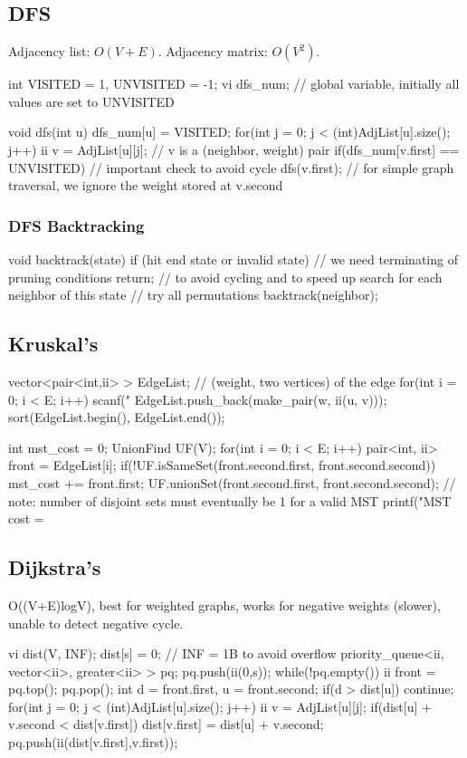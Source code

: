 \documentclass{article}
\begin{document}
\subsection{DFS}
Adjacency list: \(O(V + E)\). Adjacency matrix: \(O(V^2)\).
\begin{mylisting}{}
int VISITED = 1, UNVISITED = -1;
vi dfs_num;	// global variable, initially all values are set to UNVISITED

void dfs(int u){
	dfs_num[u] = VISITED;
	for(int j = 0; j < (int)AdjList[u].size(); j++){
			ii v = AdjList[u][j];	// v is a (neighbor, weight) pair
			if(dfs_num[v.first] == UNVISITED)	// important check to avoid cycle
				dfs(v.first);
	}	// for simple graph traversal, we ignore the weight stored at v.second
}
\end{mylisting}

\subsubsection{DFS Backtracking}
\begin{mylisting}{}
void backtrack(state){
	if (hit end state or invalid state)	// we need terminating of pruning conditions
		return;	// to avoid cycling and to speed up search
	for each neighbor of this state	// try all permutations
		backtrack(neighbor);
}
\end{mylisting}

\subsection{Kruskal's}
\begin{mylisting}{}
vector<pair<int,ii> > EdgeList;	// (weight, two vertices) of the edge
for(int i = 0; i < E; i++){
	scanf("%
	EdgeList.push_back(make_pair(w, ii(u, v)));
}
sort(EdgeList.begin(), EdgeList.end());

int mst_cost = 0;
UnionFind UF(V);
for(int i = 0; i < E; i++){
	pair<int, ii> front = EdgeList[i];
	if(!UF.isSameSet(front.second.first, front.second.second)){
		mst_cost += front.first;
		UF.unionSet(front.second.first, front.second.second);
	}
} // note: number of disjoint sets must eventually be 1 for a valid MST
printf("MST cost = %
\end{mylisting}

\subsection{Dijkstra's}
O((V+E)logV), best for weighted graphs, works for negative weights (slower), unable to detect negative cycle.
\begin{mylisting}{}
vi dist(V, INF); dist[s] = 0;		// INF = 1B to avoid overflow
priority_queue<ii, vector<ii>, greater<ii> > pq; pq.push(ii(0,s));
while(!pq.empty()){
	ii front = pq.top(); pq.pop();	
	int d = front.first, u = front.second;
	if(d > dist[u]) continue;		
	for(int j = 0; j < (int)AdjList[u].size(); j++){
		ii v = AdjList[u][j];	
		if(dist[u] + v.second < dist[v.first]){
			dist[v.first] = dist[u] + v.second;	
			pq.push(ii(dist[v.first],v.first));
		}
	}
}
\end{mylisting}
\end{document}
